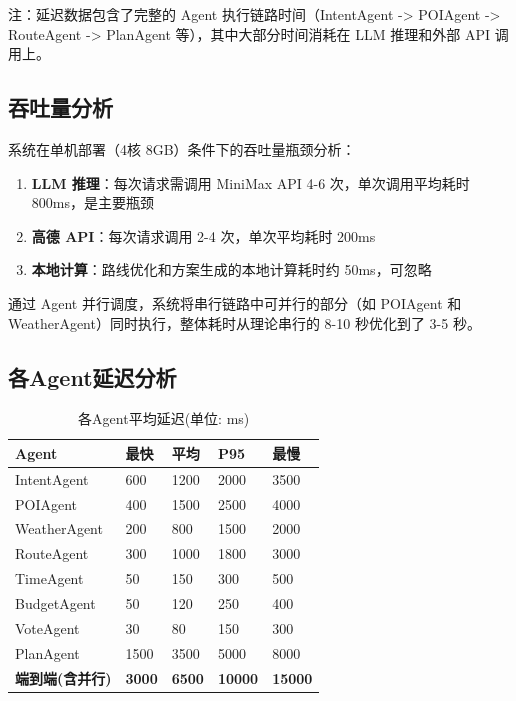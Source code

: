 \documentclass[12pt,a4paper]{ctexart}
\begin{document}
注：延迟数据包含了完整的 Agent 执行链路时间（IntentAgent -> POIAgent -> RouteAgent -> PlanAgent 等），其中大部分时间消耗在 LLM 推理和外部 API 调用上。

\subsection{吞吐量分析}

系统在单机部署（4核 8GB）条件下的吞吐量瓶颈分析：

\begin{enumerate}[leftmargin=2em]
  \item \textbf{LLM 推理}：每次请求需调用 MiniMax API 4-6 次，单次调用平均耗时 800ms，是主要瓶颈
  \item \textbf{高德 API}：每次请求调用 2-4 次，单次平均耗时 200ms
  \item \textbf{本地计算}：路线优化和方案生成的本地计算耗时约 50ms，可忽略
\end{enumerate}

通过 Agent 并行调度，系统将串行链路中可并行的部分（如 POIAgent 和 WeatherAgent）同时执行，整体耗时从理论串行的 8-10 秒优化到了 3-5 秒。

\subsection{各Agent延迟分析}

\begin{table}[H]
\centering
\caption{各Agent平均延迟(单位: ms)}
\label{tab:agent-latency}
\renewcommand{\arraystretch}{1.3}
\begin{tabularx}{\textwidth}{lXXXX}
\toprule
\textbf{Agent} & \textbf{最快} & \textbf{平均} & \textbf{P95} & \textbf{最慢} \\
\midrule
IntentAgent & 600 & 1200 & 2000 & 3500 \\
POIAgent & 400 & 1500 & 2500 & 4000 \\
WeatherAgent & 200 & 800 & 1500 & 2000 \\
RouteAgent & 300 & 1000 & 1800 & 3000 \\
TimeAgent & 50 & 150 & 300 & 500 \\
BudgetAgent & 50 & 120 & 250 & 400 \\
VoteAgent & 30 & 80 & 150 & 300 \\
PlanAgent & 1500 & 3500 & 5000 & 8000 \\
\midrule
\textbf{端到端(含并行)} & \textbf{3000} & \textbf{6500} & \textbf{10000} & \textbf{15000} \\
\bottomrule
\end{tabularx}
\end{table}
\end{document}
